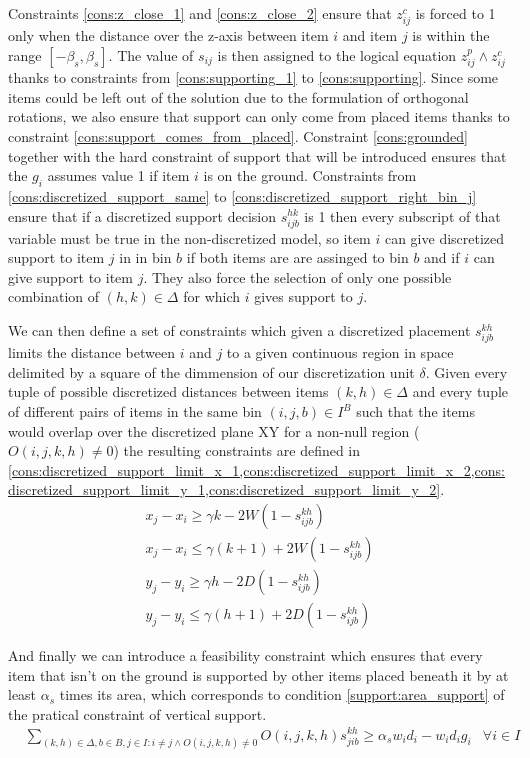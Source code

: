 Constraints \ref{cons:z_close_1} and \ref{cons:z_close_2} ensure that $z^c_{ij}$ is forced to 1 only when the distance over the z-axis between item $i$ and item $j$ is within the range $[-\beta_s, \beta_s]$.
The value of $s_{ij}$ is then assigned to the logical equation $z^p_{ij} \land z^c_{ij}$ thanks to constraints from \ref{cons:supporting_1} to \ref{cons:supporting}.
Since some items could be left out of the solution due to the formulation of orthogonal rotations, we also ensure that support can only come from placed items thanks to constraint \ref{cons:support_comes_from_placed}.
Constraint \ref{cons:grounded} together with the hard constraint of support that will be introduced ensures that the $g_i$ assumes value 1 if item $i$ is on the ground.
Constraints from \ref{cons:discretized_support_same} to \ref{cons:discretized_support_right_bin_j} ensure that if a discretized support decision $s_{ijb}^{hk}$ is 1 then every subscript of that variable must be true in the non-discretized model, so item $i$ can give discretized support to item $j$ in in bin $b$ if both items are are assinged to bin $b$ and if $i$ can give support to item $j$. They also force the selection of only one possible combination of $(h,k) \in \Delta$ for which $i$ gives support to $j$.

We can then define a set of constraints which given a discretized placement $s^{k h}_{i j b}$ limits the distance between $i$ and $j$ to a given continuous region in space delimited by a square of the dimmension of our discretization unit $\delta$. 
Given every tuple of possible discretized distances between items $ (k, h) \in \Delta$ and every tuple of different pairs of items in the same bin $(i, j, b) \in I^B$ such that the items would overlap over the discretized plane XY for a non-null region ($O(i, j, k, h) \neq 0$) the resulting constraints are defined in \cref{cons:discretized_support_limit_x_1,cons:discretized_support_limit_x_2,cons:discretized_support_limit_y_1,cons:discretized_support_limit_y_2}.
\begin{align}
    & x_j - x_i \ge \gamma k - 2W( 1 - s^{k h}_{i j b}) &  \label{cons:discretized_support_limit_x_1} \\
    & x_j - x_i \le \gamma (k + 1) + 2W( 1 - s^{k h}_{i j b}) &  \label{cons:discretized_support_limit_x_2} \\
    & y_j - y_i \ge \gamma h - 2D( 1 - s^{k h}_{i j b}) &  \label{cons:discretized_support_limit_y_1} \\
    & y_j - y_i \le \gamma (h + 1) + 2D( 1 - s^{k h}_{i j b}) &  \label{cons:discretized_support_limit_y_2}
\end{align}

And finally we can introduce a feasibility constraint which ensures that every item that isn't on the ground is supported by other items placed beneath it by at least $\alpha_s$ times its area, which corresponds to condition \ref{support:area_support} of the pratical constraint of vertical support.
\begin{eqnarray}
    & \sum\limits_{(k, h) \in \Delta, b \in B, j \in I : i \neq j \land O(i, j, k, h) \neq 0}{ O(i, j, k, h)s^{k h}_{j i b}} \ge \alpha_s w_i d_i - w_i d_i g_i & \forall i \in I \label{cons:every_item_is_supported}
\end{eqnarray}